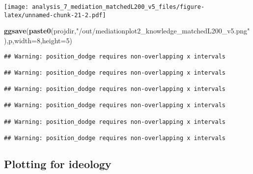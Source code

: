 \documentclass[
]{article}
\newenvironment{Shaded}{\begin{snugshade}}{\end{snugshade}}
\newcommand{\DataTypeTok}[1]{\textcolor[rgb]{0.13,0.29,0.53}{#1}}
\newcommand{\DecValTok}[1]{\textcolor[rgb]{0.00,0.00,0.81}{#1}}
\newcommand{\KeywordTok}[1]{\textcolor[rgb]{0.13,0.29,0.53}{\textbf{#1}}}
\newcommand{\NormalTok}[1]{#1}
\newcommand{\StringTok}[1]{\textcolor[rgb]{0.31,0.60,0.02}{#1}}
\begin{document}
\texttt{[image: analysis\_7\_mediation\_matchedL200\_v5\_files/figure-latex/unnamed-chunk-21-2.pdf]}

\begin{Shaded}
\begin{Highlighting}[]
\KeywordTok{ggsave}\NormalTok{(}\KeywordTok{paste0}\NormalTok{(projdir,}\StringTok{"/out/mediationplot2_knowledge_matchedL200_v5.png"}\NormalTok{),p,}\DataTypeTok{width=}\DecValTok{8}\NormalTok{,}\DataTypeTok{height=}\DecValTok{5}\NormalTok{)}
\end{Highlighting}
\end{Shaded}

\begin{verbatim}
## Warning: position_dodge requires non-overlapping x intervals

## Warning: position_dodge requires non-overlapping x intervals

## Warning: position_dodge requires non-overlapping x intervals

## Warning: position_dodge requires non-overlapping x intervals

## Warning: position_dodge requires non-overlapping x intervals

## Warning: position_dodge requires non-overlapping x intervals
\end{verbatim}

\hypertarget{plotting-for-ideology}{%
\subsection{Plotting for ideology}\label{plotting-for-ideology}}
\end{document}
